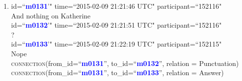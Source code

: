 \documentclass{article}
\begin{document}
\begin{enumerate}[resume]
\item id=``\textbf{\textcolor{blue}{m0131}}'" time=``2015-02-09 21:21:46 UTC" participant=``152116"\\
And nothing on Katherine\\
id=``\textbf{\textcolor{blue}{m0132}}'" time=``2015-02-09 21:21:51 UTC" participant=``152116"\\
?\\
id=``\textbf{\textcolor{blue}{m0133}}'" time=``2015-02-09 21:22:19 UTC" participant=``152115"\\
Nope\\
\textsc{connection}(from\_id=``\textbf{\textcolor{blue}{m0131}}'', to\_id=``\textbf{\textcolor{blue}{m0132}}'', relation = Punctuation)\\
\textsc{connection}(from\_id=``\textbf{\textcolor{blue}{m0131}}'', to\_id=``\textbf{\textcolor{blue}{m0133}}'', relation = Answer)
\end{enumerate}
\end{document}
